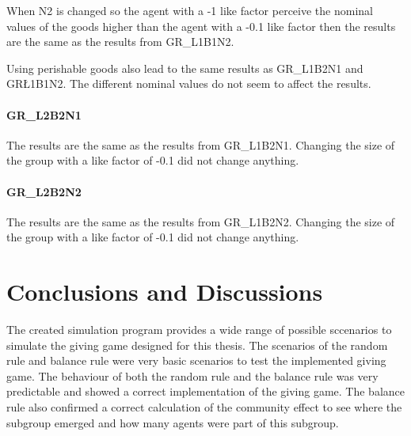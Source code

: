 \documentclass[twoside,openright]{uva-bachelor-thesis}
\begin{document}
When N2 is changed so the agent with a -1 like factor perceive the nominal values of the goods higher than the agent with a -0.1 like factor then the results are the same as the results from GR\_L1B1N2.

Using perishable goods also lead to the same results as GR\_L1B2N1 and GR\L1B1N2. The different nominal values do not seem to affect the results.

\subsubsection{GR\_L2B2N1}
The results are the same as the results from GR\_L1B2N1. Changing the size of the group with a like factor of -0.1 did not change anything. 
\subsubsection{GR\_L2B2N2}
The results are the same as the results from GR\_L1B2N2. Changing the size of the group with a like factor of -0.1 did not change anything. 


\chapter{Conclusions and Discussions}
The created simulation program provides a wide range of possible sccenarios to simulate the giving game designed for this thesis. The scenarios of the random rule and balance rule were very basic scenarios to test the implemented giving game. The behaviour of both the random rule and the balance rule was very predictable and showed a correct implementation of the giving game. The balance rule also confirmed a correct calculation of the community effect to see where the subgroup emerged and how many agents were part of this subgroup.
\end{document}
